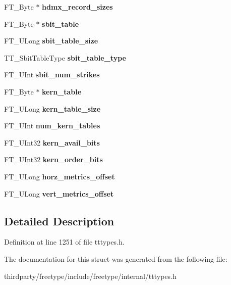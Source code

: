 \begin{DoxyCompactItemize}
F\+T\+\_\+\+Byte $\ast$ {\bfseries hdmx\+\_\+record\+\_\+sizes}
\item 
\mbox{\label{struct_t_t___face_rec___ade433be10a16d4193e3527c5b1b73fcd}} 
F\+T\+\_\+\+Byte $\ast$ {\bfseries sbit\+\_\+table}
\item 
\mbox{\label{struct_t_t___face_rec___ae16d371d8ca112b3e1f4cd35c256c829}} 
F\+T\+\_\+\+U\+Long {\bfseries sbit\+\_\+table\+\_\+size}
\item 
\mbox{\label{struct_t_t___face_rec___a0e4c61a4dec0b1c99009b883dd037484}} 
T\+T\+\_\+\+Sbit\+Table\+Type {\bfseries sbit\+\_\+table\+\_\+type}
\item 
\mbox{\label{struct_t_t___face_rec___a763b677d9356ea3ba116d113ebcb39e1}} 
F\+T\+\_\+\+U\+Int {\bfseries sbit\+\_\+num\+\_\+strikes}
\item 
\mbox{\label{struct_t_t___face_rec___ae445fbf0615a96f81b034b77ae1343a2}} 
F\+T\+\_\+\+Byte $\ast$ {\bfseries kern\+\_\+table}
\item 
\mbox{\label{struct_t_t___face_rec___acfef0fabbe95af382fb0710edfe98887}} 
F\+T\+\_\+\+U\+Long {\bfseries kern\+\_\+table\+\_\+size}
\item 
\mbox{\label{struct_t_t___face_rec___a9c5b27564d0c22e0ee6edd7b6dc675c0}} 
F\+T\+\_\+\+U\+Int {\bfseries num\+\_\+kern\+\_\+tables}
\item 
\mbox{\label{struct_t_t___face_rec___a5f97232ee6773a57ef8734555cc960e1}} 
F\+T\+\_\+\+U\+Int32 {\bfseries kern\+\_\+avail\+\_\+bits}
\item 
\mbox{\label{struct_t_t___face_rec___a810b4e002ebbdfcb44005cb69b09a917}} 
F\+T\+\_\+\+U\+Int32 {\bfseries kern\+\_\+order\+\_\+bits}
\item 
\mbox{\label{struct_t_t___face_rec___a5ff62c77d90743e333ca8dfa7d382f22}} 
F\+T\+\_\+\+U\+Long {\bfseries horz\+\_\+metrics\+\_\+offset}
\item 
\mbox{\label{struct_t_t___face_rec___a33baf2e26d533d82f06875361fd423d1}} 
F\+T\+\_\+\+U\+Long {\bfseries vert\+\_\+metrics\+\_\+offset}
\end{DoxyCompactItemize}


\subsection{Detailed Description}


Definition at line 1251 of file tttypes.\+h.



The documentation for this struct was generated from the following file\+:\begin{DoxyCompactItemize}
\item 
thirdparty/freetype/include/freetype/internal/tttypes.\+h\end{DoxyCompactItemize}

